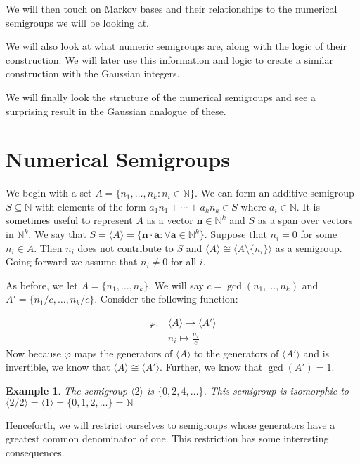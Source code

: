 \documentclass[11pt]{amsart}
\theoremstyle{plain}
\newtheorem{exa}{Example}
\theoremstyle{definition}
\begin{document}
We will then touch on Markov bases and their relationships to the numerical
semigroups we will be looking at.

We will also look at what numeric semigroups are, along with the logic of their
construction. We will later use this information and logic to create a similar
construction with the Gaussian integers.

We will finally look the structure of the numerical semigroups and see a
surprising result in the Gaussian analogue of these.

\section{Numerical Semigroups}

We begin with a set $A=\{n_1,\dots,n_k:n_i\in \mathbb{N}\}$. We can form an
additive semigroup $S\subseteq \mathbb{N}$ with elements of the form
$a_1n_1+\cdots+{a_k}n_k\in S$ where $a_i\in \mathbb{N}$. It is sometimes useful
to represent $A$ as a vector $\mathbf{n}\in \mathbb{N}^k$ and $S$ as a span over vectors in $\mathbb{N}^k$. We say that $S=\langle A\rangle=\{\mathbf{n}\cdot\mathbf{a}:
\forall\mathbf{a}\in \mathbb{N}^k\}$. Suppose that $n_i=0$ for some $n_i\in A$.
Then $n_i$ does not contribute to $S$ and $\langle A\rangle \cong \langle
A\setminus \{n_i\}\rangle$ as a semigroup. Going forward we assume that
$n_i\ne 0$ for all $i$.

As before, we let $A=\{n_1,\dots,n_k\}$. We will say $c=\gcd(n_1,\dots,n_k)$ and
$A'=\{n_1/c,\dots,n_k/c\}$. Consider the following function:

\begin{align*}
  \varphi:&\langle A\rangle \to \langle A'\rangle\\
  &n_i\mapsto \frac{n_i}{c}
\end{align*}
Now because $\varphi$ maps the generators of $\langle A\rangle$ to the generators
of $\langle A'\rangle$ and is invertible, we know that $\langle A\rangle \cong
\langle A'\rangle $. Further, we know that $\gcd(A')=1$.
\begin{exa}
  The semigroup $\langle2\rangle$ is $\{0,2,4,\dots \}$. This semigroup is isomorphic to $\langle 2/2\rangle=\langle1\rangle=\{0,1,2,\dots\}=\mathbb{N}$
\end{exa}

Henceforth, we will
restrict ourselves to semigroups whose generators have a greatest common
denominator of one. This restriction has some interesting consequences.
\end{document}
